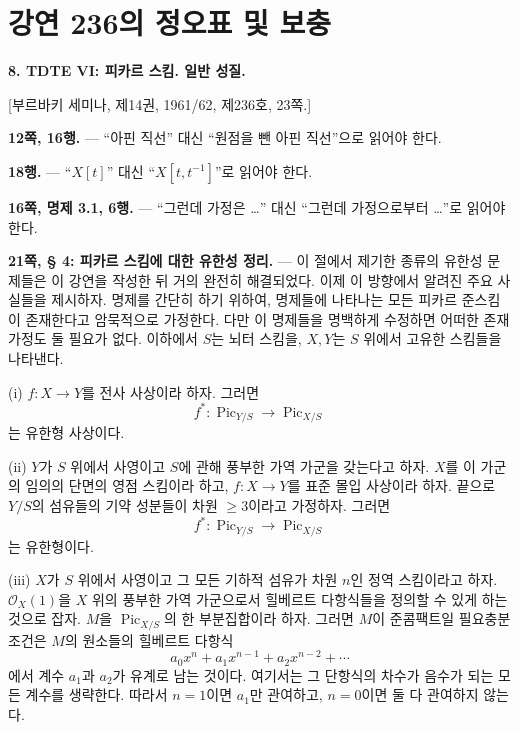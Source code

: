 \clearpage
\chapter*{강연 236의 정오표 및 보충}

\noindent\textbf{8. TDTE VI: 피카르 스킴. 일반 성질.}

\begin{center}
[부르바키 세미나, 제14권, 1961/62, 제236호, 23쪽.]
\end{center}

\noindent\textbf{12쪽, 16행.} --- ``아핀 직선'' 대신
``원점을 뺀 아핀 직선''으로 읽어야 한다.

\noindent\textbf{18행.} --- ``$X[t]$'' 대신
``$X[t,t^{-1}]$''로 읽어야 한다.

\noindent\textbf{16쪽, 명제 3.1, 6행.} --- ``그런데 가정은 …'' 대신
``그런데 가정으로부터 …''로 읽어야 한다.

\noindent\textbf{21쪽, § 4: 피카르 스킴에 대한 유한성 정리.} ---
이 절에서 제기한 종류의 유한성 문제들은 이 강연을 작성한 뒤 거의 완전히
해결되었다. 이제 이 방향에서 알려진 주요 사실들을 제시하자. 명제를
간단히 하기 위하여, 명제들에 나타나는 모든 피카르 준스킴이 존재한다고
암묵적으로 가정한다. 다만 이 명제들을 명백하게 수정하면 어떠한 존재
가정도 둘 필요가 없다. 이하에서 $S$는 뇌터 스킴을, $X,Y$는 $S$ 위에서
고유한 스킴들을 나타낸다.

\medskip
\noindent(i) $f:X\longrightarrow Y$를 전사 사상이라 하자. 그러면
\[
f^*: \operatorname{Pic}_{Y/S}\longrightarrow\operatorname{Pic}_{X/S}
\]
는 유한형 사상이다.

\noindent(ii) $Y$가 $S$ 위에서 사영이고 $S$에 관해 풍부한 가역 가군을
갖는다고 하자. $X$를 이 가군의 임의의 단면의 영점 스킴이라 하고,
$f:X\longrightarrow Y$를 표준 몰입 사상이라 하자. 끝으로 $Y/S$의
섬유들의 기약 성분들이 차원 $\geq3$이라고 가정하자. 그러면
\[
f^*: \operatorname{Pic}_{Y/S}\longrightarrow\operatorname{Pic}_{X/S}
\]
는 유한형이다.

\noindent(iii) $X$가 $S$ 위에서 사영이고 그 모든 기하적 섬유가 차원
$n$인 정역 스킴이라고 하자. $\mathcal O_X(1)$을 $X$ 위의 풍부한 가역
가군으로서 힐베르트 다항식들을 정의할 수 있게 하는 것으로 잡자. $M$을
$\operatorname{Pic}_{X/S}$의 한 부분집합이라 하자. 그러면 $M$이
준콤팩트일 필요충분조건은 $M$의 원소들의 힐베르트 다항식
\[
a_0x^n+a_1x^{n-1}+a_2x^{n-2}+\cdots
\]
에서 계수 $a_1$과 $a_2$가 유계로 남는 것이다. 여기서는 그 단항식의
차수가 음수가 되는 모든 계수를 생략한다. 따라서 $n=1$이면 $a_1$만
관여하고, $n=0$이면 둘 다 관여하지 않는다.


